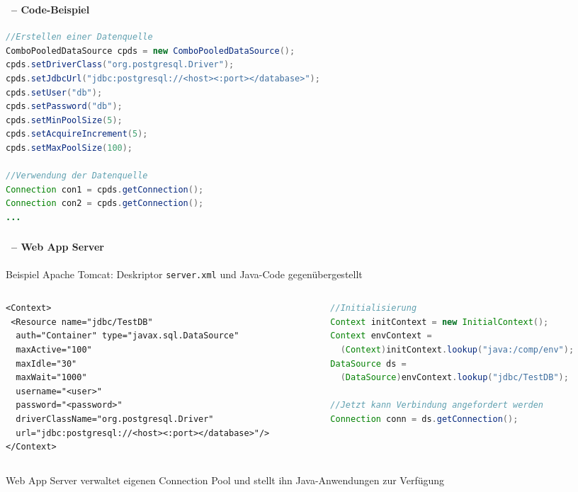 \begin{frame}[fragile]\frametitle{\insertsection}
\framesubtitle{\insertsubsection\ -- Code-Beispiel}
\begin{lstlisting}[xleftmargin=3ex, showstringspaces=false, language=Java]
//Erstellen einer Datenquelle
ComboPooledDataSource cpds = new ComboPooledDataSource(); 
cpds.setDriverClass("org.postgresql.Driver");
cpds.setJdbcUrl("jdbc:postgresql://<host><:port></database>");
cpds.setUser("db");
cpds.setPassword("db"); 
cpds.setMinPoolSize(5); 
cpds.setAcquireIncrement(5);
cpds.setMaxPoolSize(100); 

//Verwendung der Datenquelle
Connection con1 = cpds.getConnection();
Connection con2 = cpds.getConnection();
...
\end{lstlisting}
\end{frame}

\begin{frame}[fragile]\frametitle{\insertsection}
\framesubtitle{\insertsubsection\ -- Web App Server}
\vspace{3mm}
Beispiel Apache Tomcat: Deskriptor \texttt{server.xml} und Java-Code gegenübergestellt
\begin{columns}
  \begin{column}{.48\textwidth}
  	\lstset{language=xml}
\begin{lstlisting}[xleftmargin=3ex, basicstyle=\ttfamily\tiny, showstringspaces=false]
<Context>
 <Resource name="jdbc/TestDB" 
  auth="Container" type="javax.sql.DataSource" 
  maxActive="100" 
  maxIdle="30" 
  maxWait="1000" 
  username="<user>" 
  password="<password>" 
  driverClassName="org.postgresql.Driver"
  url="jdbc:postgresql://<host><:port></database>"/> 
</Context>
\end{lstlisting}
	\end{column}
	\begin{column}{.48\textwidth}
\lstset{language=Java}
\begin{lstlisting}[xleftmargin=3ex, basicstyle=\ttfamily\tiny, showstringspaces=false, language=Java]
//Initialisierung
Context initContext = new InitialContext(); 
Context envContext = 
  (Context)initContext.lookup("java:/comp/env");
DataSource ds = 
  (DataSource)envContext.lookup("jdbc/TestDB");
			
//Jetzt kann Verbindung angefordert werden
Connection conn = ds.getConnection(); 
\end{lstlisting}
  \end{column}
\end{columns}
Web App Server verwaltet eigenen Connection Pool und stellt ihn Java-Anwendungen zur Verf\"ugung
\end{frame}

